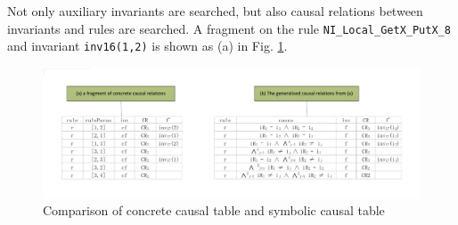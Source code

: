 \documentclass{llncs-new}
\begin{document}
Not only auxiliary invariants are searched, but also causal relations between   invariants and  rules are searched. A fragment on the rule {\tt NI\_Local\_GetX\_PutX\_8} and invariant {\tt inv16(1,2)} is shown as (a) in Fig. \ref{fig:twoTables}.
\vspace{-30pt}
\begin{figure}[htbp]
\hspace{-30pt}
\includegraphics[width=1.2 \textwidth ]{twotabGeneralization.pdf}%
\vspace{-20pt}
\caption{Comparison of concrete causal table and symbolic causal table \label{fig:twoTables}}
\end{figure}
\end{document}
